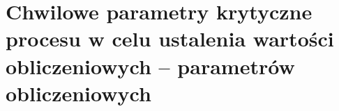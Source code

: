\section{Chwilowe parametry krytyczne procesu w celu ustalenia wartości obliczeniowych
– parametrów obliczeniowych}